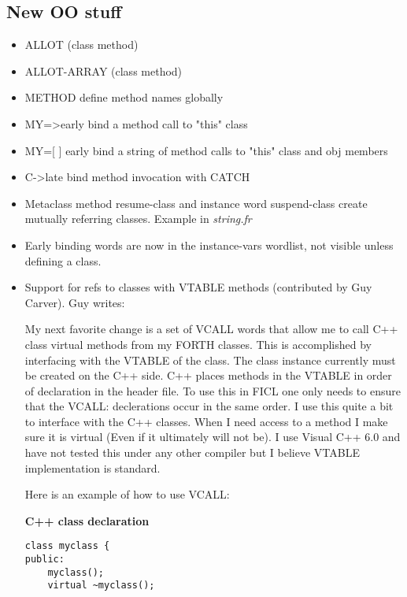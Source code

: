 \subsection*{New OO stuff}
\begin{itemize}[noitemsep]
	\item ALLOT (class method)

	\item ALLOT-ARRAY (class method)

	\item METHOD define method names globally

	\item MY=\textgreater  early bind a method call to "this" class

	\item MY=[ ] early bind a string of method calls to "this" class
	and obj members

	\item C-\textgreater  late bind method invocation with CATCH

	\item Metaclass method resume-class and instance word
	suspend-class create mutually referring classes. Example in
	\textit{string.fr}

	\item Early binding words are now in the instance-vars wordlist,
	not visible unless defining a class.

	\item Support for refs to classes with VTABLE methods
	(contributed by Guy Carver). Guy writes:

	My next favorite change is a set of VCALL words that allow me to
	call C++ class virtual methods from my FORTH classes. This is
	accomplished by interfacing with the VTABLE of the class. The
	class instance currently must be created on the C++ side. C++
	places methods in the VTABLE in order of declaration in the
	header file. To use this in FICL one only needs to ensure that
	the VCALL: declerations occur in the same order. I use this
	quite a bit to interface with the C++ classes. When I need
	access to a method I make sure it is virtual (Even if it
	ultimately will not be). I use Visual C++ 6.0 and have not
	tested this under any other compiler but I believe VTABLE
	implementation is standard.

	Here is an example of how to use VCALL:

	\textbf{C++ class declaration}
\begin{lstlisting}[frame=single]
class myclass {
public:
	myclass();
	virtual ~myclass();


\end{lstlisting}
\end{itemize}
